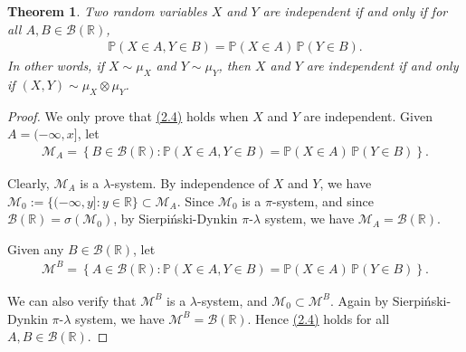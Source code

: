 \documentclass{article}
\numberwithin{equation}{section}
\renewcommand{\P}{\mathbb{P}}
\theoremstyle{plain}
\newtheorem{theorem}{Theorem}[section]
\theoremstyle{definition}
\begin{document}
\begin{theorem}\label{thm:2.10} Two random variables $X$ and $Y$ are independent if and only if for all $A,B\in\mathscr{B}(\mathbb{R})$,
\begin{align*}
	\P(X\in A,Y\in B)=\P(X\in A)\,\P(Y\in B).\tag{2.4}\label{eq:2.4}
\end{align*}
In other words, if $X\sim\mu_X$ and $Y\sim\mu_Y$, then $X$ and $Y$ are independent if and only if $(X,Y)\sim\mu_X\otimes\mu_Y$.
\end{theorem}
\begin{proof}
We only prove that \hyperref[eq:2.4]{(2.4)} holds when $X$ and $Y$ are independent. Given $A=(-\infty,x]$, let 
\begin{align*}
	\mathscr{M}_A=\left\{B\in\mathscr{B}(\mathbb{R}):\P(X\in A,Y\in B)=\P(X\in A)\,\P(Y\in B)\right\}.
\end{align*}

Clearly, $\mathscr{M}_A$ is a $\lambda$-system. By independence of $X$ and $Y$, we have $\mathscr{M}_0:=\{(-\infty,y]:y\in\mathbb{R}\}\subset\mathscr{M}_A$. Since $\mathscr{M}_0$ is a $\pi$-system, and since $\mathscr{B}(\mathbb{R})=\sigma(\mathscr{M}_0)$, by Sierpiński-Dynkin $\pi$-$\lambda$ system, we have $\mathscr{M}_A=\mathscr{B}(\mathbb{R})$.

Given any $B\in\mathscr{B}(\mathbb{R})$, let 
\begin{align*}
	\mathscr{M}^B=\left\{A\in\mathscr{B}(\mathbb{R}):\P(X\in A,Y\in B)=\P(X\in A)\,\P(Y\in B)\right\}.
\end{align*}

We can also verify that $\mathscr{M}^B$ is a $\lambda$-system, and $\mathscr{M}_0\subset\mathscr{M}^B$. Again by Sierpiński-Dynkin $\pi$-$\lambda$ system, we have $\mathscr{M}^B=\mathscr{B}(\mathbb{R})$. Hence \hyperref[eq:2.4]{(2.4)} holds for all $A,B\in\mathscr{B}(\mathbb{R})$.
\end{proof}
\end{document}
